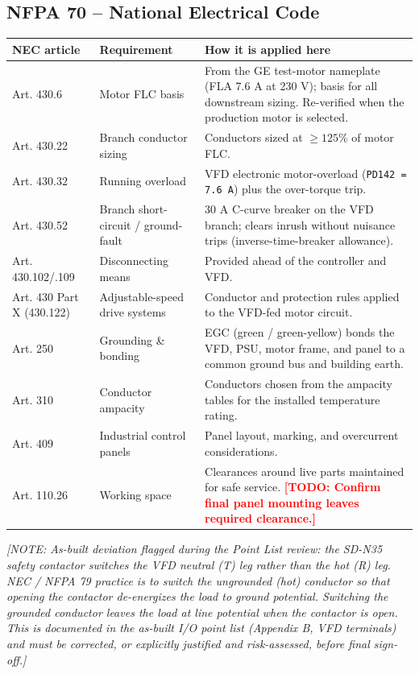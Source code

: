 \documentclass[hidelinks,12pt]{article}
\newcommand{\todo}[1]{\textcolor{red}{\textbf{[TODO: #1]}}}
\newcommand{\note}[1]{\textcolor{PSUblue}{\textit{[NOTE: #1]}}}
\begin{document}
\subsection{NFPA 70 -- National Electrical Code}
\label{subsec:nec}
\renewcommand{\arraystretch}{1.3}
\noindent\begin{tabularx}{\textwidth}{|p{2.5cm}|p{3.0cm}|X|}
\hline
\rowcolor{PSUgreen!12}\textbf{NEC article} & \textbf{Requirement} & \textbf{How it is applied here} \\
\hline
Art. 430.6 & Motor FLC basis & From the GE test-motor nameplate (FLA 7.6 A at 230 V); basis for all downstream sizing. Re-verified when the production motor is selected. \\ \hline
Art. 430.22 & Branch conductor sizing & Conductors sized at $\geq 125\%$ of motor FLC. \\ \hline
Art. 430.32 & Running overload & VFD electronic motor-overload (\texttt{PD142 = 7.6 A}) plus the over-torque trip. \\ \hline
Art. 430.52 & Branch short-circuit / ground-fault & 30 A C-curve breaker on the VFD branch; clears inrush without nuisance trips (inverse-time-breaker allowance). \\ \hline
Art. 430.102/.109 & Disconnecting means & Provided ahead of the controller and VFD. \\ \hline
Art. 430 Part X (430.122) & Adjustable-speed drive systems & Conductor and protection rules applied to the VFD-fed motor circuit. \\ \hline
Art. 250 & Grounding \& bonding & EGC (green / green-yellow) bonds the VFD, PSU, motor frame, and panel to a common ground bus and building earth. \\ \hline
Art. 310 & Conductor ampacity & Conductors chosen from the ampacity tables for the installed temperature rating. \\ \hline
Art. 409 & Industrial control panels & Panel layout, marking, and overcurrent considerations. \\ \hline
Art. 110.26 & Working space & Clearances around live parts maintained for safe service. \todo{Confirm final panel mounting leaves required clearance.} \\
\hline
\end{tabularx}
\renewcommand{\arraystretch}{1.0}

\note{As-built deviation flagged during the Point List review: the SD-N35 safety
contactor switches the VFD \emph{neutral} (T) leg rather than the \emph{hot} (R) leg.
NEC / NFPA 79 practice is to switch the ungrounded (hot) conductor so that opening the
contactor de-energizes the load to ground potential. Switching the grounded conductor
leaves the load at line potential when the contactor is open. This is documented in
the as-built I/O point list (Appendix B, VFD terminals) and must be corrected, or
explicitly justified and risk-assessed, before final sign-off.}
\end{document}

